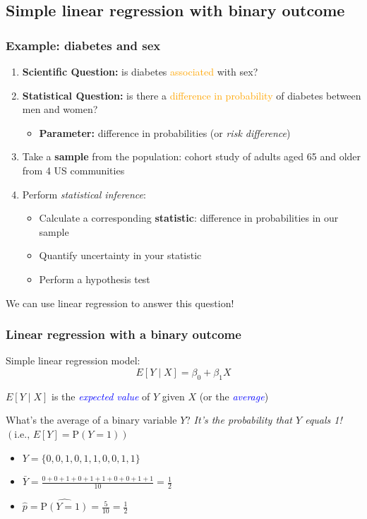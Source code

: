 \documentclass[12pt, 
hyperref={colorlinks=true, linkcolor=blue, urlcolor=cyan}]{beamer}
\begin{document}
\subsection{Simple linear regression with binary outcome}
\begin{frame}
\frametitle{Example: diabetes and sex}

\begin{enumerate}
\item \textbf{Scientific Question:} is diabetes \textcolor{orange}{associated} with sex? \pause
\item \textbf{Statistical Question:} is there a \textcolor{orange}{difference in probability} of diabetes between men and women? \pause
	\begin{itemize}
	\item \textbf{Parameter:} difference in probabilities (or \textit{risk difference}) \pause
	\end{itemize}
\item Take a \textbf{sample} from the population: cohort study of adults aged 65 and older from 4 US communities \pause
\item Perform \textit{statistical inference}:
	\begin{itemize}
	\item Calculate a corresponding \textbf{statistic}: difference in probabilities in our sample
	\item Quantify uncertainty in your statistic
	\item Perform a hypothesis test \pause
	\end{itemize}
\end{enumerate}

We can use linear regression to answer this question!
\end{frame}

\begin{frame}
\frametitle{Linear regression with a binary outcome}

Simple linear regression model: $$E[Y \mid X] = \beta_0 + \beta_1 X$$

$E[Y \mid X]$ is the \textcolor{blue}{\textit{expected value}} of $Y$ given $X$ (or the \textcolor{blue}{\textit{average}}) \pause

What's the average of a binary variable $Y$? \pause \textit{It's the probability that $Y$ equals 1!} $\left(\text{i.e., } E[Y] = \text{P}(Y=1)\right)$ \pause

\begin{itemize} \itemsep +12pt
\item[] $Y = \{ 0, 0, 1, 0, 1, 1, 0, 0, 1, 1 \}$ \pause
\item[] $\bar{Y} = \frac{0 + 0 + 1 + 0 + 1 + 1 + 0 + 0 + 1 + 1}{10} = \frac{1}{2}$ \pause
\item[] $\hat{p} = \widehat{\text{P}(Y=1)} = \frac{5}{10} = \frac{1}{2} $
\end{itemize}
\end{frame}
\end{document}

